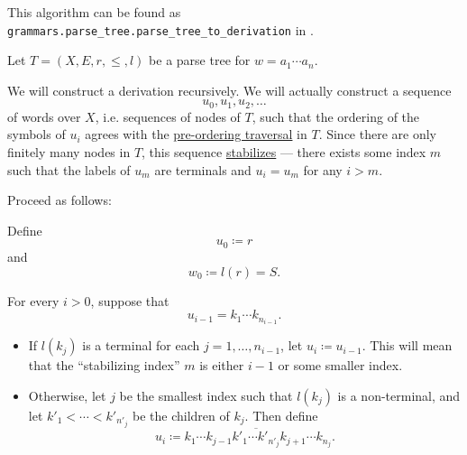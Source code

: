\begin{comments}
  \item This algorithm can be found as \texttt{grammars.parse\_tree.parse\_tree\_to\_derivation} in \cite{code}.
\end{comments}

\begin{algorithm}\label{alg:leftmost_derivation_from_parse_tree}
  Let \( T = (X, E, r, \leq, l) \) be a parse tree for \( w = a_1 \cdots a_n \).

  We will construct a derivation recursively. We will actually construct a sequence
  \begin{equation*}
    u_0, u_1, u_2, \ldots
  \end{equation*}
  of words over \( X \), i.e. sequences of nodes of \( T \), such that the ordering of the symbols of \( u_i \) agrees with the \hyperref[def:traversal_ordering]{pre-ordering traversal} in \( T \). Since there are only finitely many nodes in \( T \), this sequence \hyperref[def:stabilizing_sequence]{stabilizes} --- there exists some index \( m \) such that the labels of \( u_m \) are terminals and \( u_i = u_m \) for any \( i > m \).

  Proceed as follows:
  \begin{thmenum}
     Define
    \begin{equation*}
      u_0 \coloneqq r
    \end{equation*}
    and
    \begin{equation*}
      w_0 \coloneqq l(r) = S.
    \end{equation*}

     For every \( i > 0 \), suppose that
    \begin{equation*}
      u_{i-1} = k_1 \cdots k_{n_{i-1}}.
    \end{equation*}

    \begin{itemize}
      \item If \( l(k_j) \) is a terminal for each \( j = 1, \ldots, n_{i-1} \), let \( u_i \coloneqq u_{i-1} \). This will mean that the \enquote{stabilizing index} \( m \) is either \( i - 1 \) or some smaller index.

      \item Otherwise, let \( j \) be the smallest index such that \( l(k_j) \) is a non-terminal, and let \( k'_1 < \cdots < k'_{n'_j} \) be the children of \( k_j \). Then define
      \begin{equation*}
        u_i \coloneqq k_1 \cdots k_{j-1} \overline{ k'_1 \cdots k'_{n'_j} } k_{j+1} \cdots k_{n_j}.
      \end{equation*}


\end{itemize}
\end{thmenum}
\end{algorithm}
